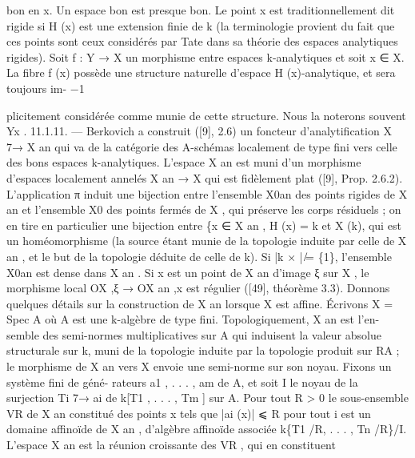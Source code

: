 \documentclass[
  10pt,
]{article}
\newenvironment{Shaded}{}{}
\newcommand{\NormalTok}[1]{#1}
\begin{document}
\begin{Shaded}
\begin{Highlighting}[]
\NormalTok{bon en x. Un espace bon est presque bon. Le point x est traditionnellement dit rigide si}
\NormalTok{H (x) est une extension finie de k (la terminologie provient du fait que ces points sont}
\NormalTok{ceux considérés par Tate dans sa théorie des espaces analytiques rigides).}
\NormalTok{   Soit f : Y → X un morphisme entre espaces k{-}analytiques et soit x ∈ X. La fibre}
\NormalTok{f (x) possède une structure naturelle d’espace H (x){-}analytique, et sera toujours im{-}}
\NormalTok{  −1}

\NormalTok{plicitement considérée comme munie de cette structure. Nous la noterons souvent Yx .}
\NormalTok{11.1.11. — Berkovich a construit ([9], 2.6) un foncteur d’analytification X 7→ X an}
\NormalTok{qui va de la catégorie des A{-}schémas localement de type fini vers celle des bons espaces}
\NormalTok{k{-}analytiques. L’espace X an est muni d’un morphisme d’espaces localement annelés}
\NormalTok{X an → X qui est fidèlement plat ([9], Prop. 2.6.2). L’application π induit une bijection}
\NormalTok{entre l’ensemble X0an des points rigides de X an et l’ensemble X0 des points fermés}
\NormalTok{de X , qui préserve les corps résiduels ; on en tire en particulier une bijection entre}
\NormalTok{\{x ∈ X an , H (x) = k et X (k), qui est un homéomorphisme (la source étant munie de}
\NormalTok{la topologie induite par celle de X an , et le but de la topologie déduite de celle de k). Si}
\NormalTok{|k × | ̸= \{1\}, l’ensemble X0an est dense dans X an .}
\NormalTok{   Si x est un point de X an d’image ξ sur X , le morphisme local OX ,ξ → OX an ,x est}
\NormalTok{régulier ([49], théorème 3.3).}
\NormalTok{   Donnons quelques détails sur la construction de X an lorsque X est affine. Écrivons}
\NormalTok{X = Spec A où A est une k{-}algèbre de type fini. Topologiquement, X an est l’en{-}}
\NormalTok{semble des semi{-}normes multiplicatives sur A qui induisent la valeur absolue structurale}
\NormalTok{sur k, muni de la topologie induite par la topologie produit sur RA ; le morphisme de}
\NormalTok{X an vers X envoie une semi{-}norme sur son noyau. Fixons un système fini de géné{-}}
\NormalTok{rateurs a1 , . . . , am de A, et soit I le noyau de la surjection Ti 7→ ai de k[T1 , . . . , Tm ]}
\NormalTok{sur A. Pour tout R \textgreater{} 0 le sous{-}ensemble VR de X an constitué des points x tels que}
\NormalTok{|ai (x)| ⩽ R pour tout i est un domaine affinoïde de X an , d’algèbre affinoïde associée}
\NormalTok{k\{T1 /R, . . . , Tn /R\}/I. L’espace X an est la réunion croissante des VR , qui en constituent}

\end{Highlighting}
\end{Shaded}
\end{document}
